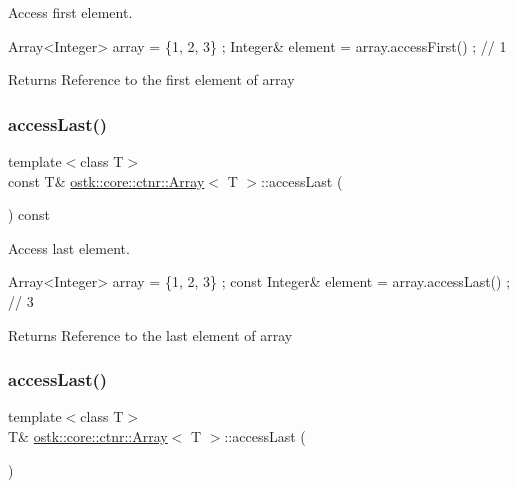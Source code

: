 Access first element. 


\begin{DoxyCode}
Array<Integer> array = \{1, 2, 3\} ;
Integer& element = array.accessFirst() ; \textcolor{comment}{// 1}
\end{DoxyCode}


\begin{DoxyReturn}{Returns}
Reference to the first element of array 
\end{DoxyReturn}
\mbox{\label{classostk_1_1core_1_1ctnr_1_1_array_a10ce6e99048cfd2fea96a934e2737604}} 
\subsubsection{\texorpdfstring{access\+Last()}{accessLast()}\hspace{0.1cm}{\footnotesize\ttfamily [1/2]}}
{\footnotesize\ttfamily template$<$class T$>$ \\
const T\& \hyperlink{classostk_1_1core_1_1ctnr_1_1_array}{ostk\+::core\+::ctnr\+::\+Array}$<$ T $>$\+::access\+Last (\begin{DoxyParamCaption}{ }\end{DoxyParamCaption}) const}



Access last element. 


\begin{DoxyCode}
Array<Integer> array = \{1, 2, 3\} ;
\textcolor{keyword}{const} Integer& element = array.accessLast() ; \textcolor{comment}{// 3}
\end{DoxyCode}


\begin{DoxyReturn}{Returns}
Reference to the last element of array 
\end{DoxyReturn}
\mbox{\label{classostk_1_1core_1_1ctnr_1_1_array_a50d0a7c9f1c121f8c6b9638663acdff3}} 
\subsubsection{\texorpdfstring{access\+Last()}{accessLast()}\hspace{0.1cm}{\footnotesize\ttfamily [2/2]}}
{\footnotesize\ttfamily template$<$class T$>$ \\
T\& \hyperlink{classostk_1_1core_1_1ctnr_1_1_array}{ostk\+::core\+::ctnr\+::\+Array}$<$ T $>$\+::access\+Last (\begin{DoxyParamCaption}{ }\end{DoxyParamCaption})}




